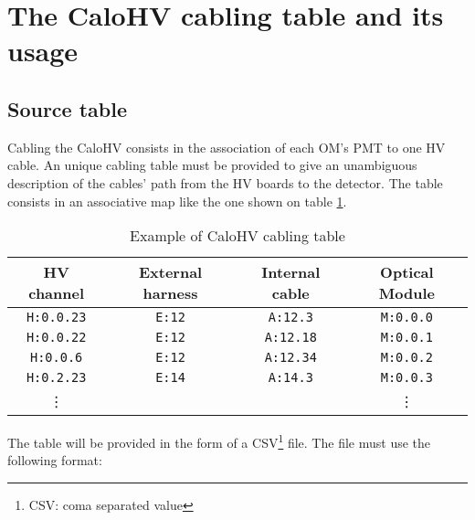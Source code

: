 
\section{The CaloHV cabling table and its usage}

\subsection{Source table}

Cabling the CaloHV consists in the association of each OM's PMT to one
HV  cable.  An  unique  cabling  table must  be  provided  to give  an
unambiguous description of the cables' path  from the HV boards to the
detector.  The table consists in an associative map like the one shown
on table \ref{tab:calohv:map:1}.

\begin{table}[h]
\begin{center}
\begin{tabular}{|c|c|c|c|}
  \hline
  \textbf{HV channel}& \textbf{External harness} & \textbf{Internal cable} & \textbf{Optical Module} \\
  \hline
  \hline
  \texttt{H:0.0.23}  & \texttt{E:12} & \texttt{A:12.3} & \texttt{M:0.0.0} \\
  \hline
  \texttt{H:0.0.22}  & \texttt{E:12} & \texttt{A:12.18} & \texttt{M:0.0.1} \\
  \hline
  \texttt{H:0.0.6}  & \texttt{E:12} & \texttt{A:12.34} & \texttt{M:0.0.2} \\
  \hline
  \texttt{H:0.2.23}  & \texttt{E:14} & \texttt{A:14.3} & \texttt{M:0.0.3} \\
  \hline
  \vdots          & & & \vdots             \\  
  \hline
  \hline
\end{tabular}
\end{center}
\caption{Example of CaloHV cabling table}
\label{tab:calohv:map:1}
\end{table}

\par\noindent  The   table  will  be   provided  in  the  form   of  a
CSV\footnote{CSV: coma  separated value} file.  The file must  use the
following format:

